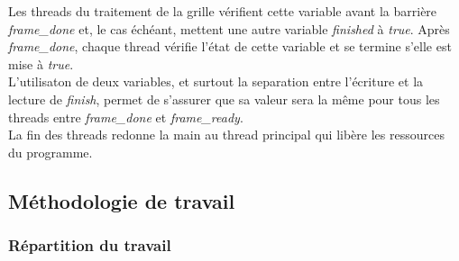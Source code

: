 \documentclass[11pt, a4paper]{article}
\begin{document}
Les threads du traitement de la grille vérifient cette variable avant la barrière \textit{frame\_done} et, le cas échéant, mettent une autre variable \textit{finished} à \textit{true}. Après \textit{frame\_done}, chaque thread vérifie l'état de cette variable et se termine s'elle est mise à \textit{true}. \\

L'utilisaton de deux variables, et surtout la separation entre l'écriture et la lecture de \textit{finish}, permet de s'assurer que sa valeur sera la même pour tous les threads entre \textit{frame\_done} et \textit{frame\_ready}. \\

La fin des threads redonne la main au thread principal qui libère les ressources du programme.

\newpage

\subsection{Méthodologie de travail}
\subsubsection{Répartition du travail}

\newpage
\end{document}
